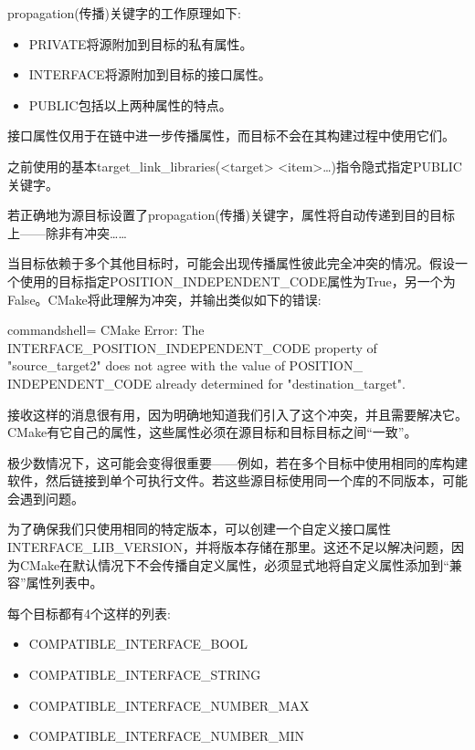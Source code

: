 propagation(传播)关键字的工作原理如下:

\begin{itemize}
\item 
PRIVATE将源附加到目标的私有属性。

\item 
INTERFACE将源附加到目标的接口属性。

\item 
PUBLIC包括以上两种属性的特点。
\end{itemize}

接口属性仅用于在链中进一步传播属性，而目标不会在其构建过程中使用它们。

之前使用的基本target\_link\_libraries(<target> <item>…)指令隐式指定PUBLIC关键字。

若正确地为源目标设置了propagation(传播)关键字，属性将自动传递到目的目标上——除非有冲突……


当目标依赖于多个其他目标时，可能会出现传播属性彼此完全冲突的情况。假设一个使用的目标指定POSITION\_INDEPENDENT\_CODE属性为True，另一个为False。CMake将此理解为冲突，并输出类似如下的错误:

\begin{tcblisting}{commandshell={}}
CMake Error: The INTERFACE_POSITION_INDEPENDENT_CODE property
of "source_target2" does not agree with the value of POSITION_
INDEPENDENT_CODE already determined for "destination_target".
\end{tcblisting}

接收这样的消息很有用，因为明确地知道我们引入了这个冲突，并且需要解决它。CMake有它自己的属性，这些属性必须在源目标和目标目标之间“一致”。

极少数情况下，这可能会变得很重要——例如，若在多个目标中使用相同的库构建软件，然后链接到单个可执行文件。若这些源目标使用同一个库的不同版本，可能会遇到问题。

为了确保我们只使用相同的特定版本，可以创建一个自定义接口属性INTERFACE\_LIB\_VERSION，并将版本存储在那里。这还不足以解决问题，因为CMake在默认情况下不会传播自定义属性，必须显式地将自定义属性添加到“兼容”属性列表中。

每个目标都有4个这样的列表:

\begin{itemize}
\item 
COMPATIBLE\_INTERFACE\_BOOL

\item 
COMPATIBLE\_INTERFACE\_STRING

\item 
COMPATIBLE\_INTERFACE\_NUMBER\_MAX

\item 
COMPATIBLE\_INTERFACE\_NUMBER\_MIN
\end{itemize}

